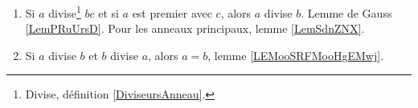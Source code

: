 	\label{THEMEooDivisibilite}
\begin{enumerate}
	\item
	      Si \( a\) divise\footnote{Divise, définition \ref{DiviseursAnneau}.} \( bc\) et si \( a\) est premier avec \( c\), alors \( a\) divise \( b\). Lemme de Gauss \ref{LemPRuUrsD}. Pour les anneaux principaux, lemme \ref{LemSdnZNX}.
	\item
	      Si \( a\) divise \( b\) et \( b\) divise \( a\), alors \( a=b\), lemme \ref{LEMooSRFMooHgEMwj}.
\end{enumerate}
